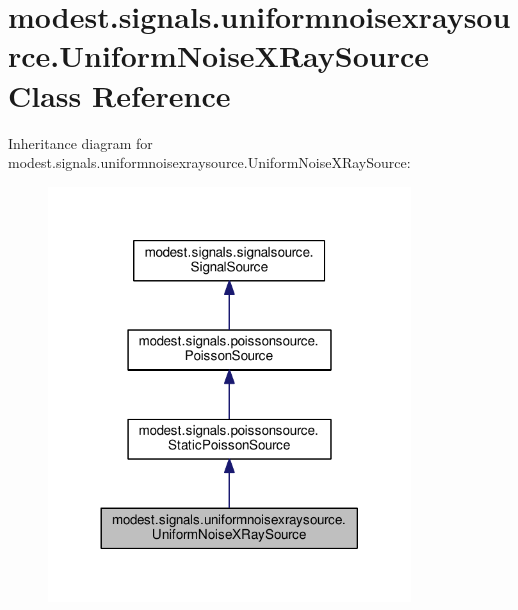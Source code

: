 \hypertarget{classmodest_1_1signals_1_1uniformnoisexraysource_1_1UniformNoiseXRaySource}{}\section{modest.\+signals.\+uniformnoisexraysource.\+Uniform\+Noise\+X\+Ray\+Source Class Reference}
\label{classmodest_1_1signals_1_1uniformnoisexraysource_1_1UniformNoiseXRaySource}


Inheritance diagram for modest.\+signals.\+uniformnoisexraysource.\+Uniform\+Noise\+X\+Ray\+Source\+:
\nopagebreak
\begin{figure}[H]
\begin{center}
\leavevmode
\includegraphics[width=272pt]{classmodest_1_1signals_1_1uniformnoisexraysource_1_1UniformNoiseXRaySource__inherit__graph}
\end{center}
\end{figure}


